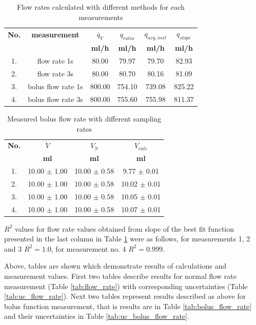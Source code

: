 \documentclass[12pt,a4paper]{article}
\begin{document}
	\begin{table}[H]
		\centering
		\begin{tabular}{|c|c|c|c|c|c|}
			\hline
			\textbf{No.} & \textbf{measurement} & $\dot{q_{V}}$ & $q_{ratio}$ & $q_{avg,inst}$ & $q_{slope}$\\
			\cline{3-6}
			& & \textbf{ml/h}& \textbf{ml/h} & \textbf{ml/h} & \textbf{ml/h}\\ \hline
			1. & flow rate 1s & 80.00 & 79.97 & 79.70 & 82.93\\ \hline
			2. & flow rate 3s & 80.00 & 80.70 & 80.16 & 81.09 \\ \hline
			3. & bolus flow rate 1s & 800.00 & 754.10 & 739.08 & 825.22 \\ \hline
			4. & bolus flow rate 3s & 800.00 & 755.60 & 755.98 & 811.37 \\ \hline
		\end{tabular}
		\caption{Flow rates calculated with different methods for each measurements}
		\label{tab:qV}
	\end{table}
	
	\begin{table}[H]
		\centering
		\begin{tabular}{|c|c|c|c|}
			\hline
			\textbf{No.} & $\dot{V}$ & $V_{S}$ & $V_{calc}$ \\
			\cline{2-4}
			& \textbf{ml} & \textbf{ml} & \textbf{ml}\\ \hline
			1. & 10.00 $\pm$ 1.00 & 10.00 $\pm$ 0.58 & 9.77 $\pm$ 0.01 \\ \hline
			2. & 10.00 $\pm$ 1.00 & 10.00 $\pm$ 0.58 & 10.02 $\pm$ 0.01  \\ \hline
			3. & 10.00 $\pm$ 1.00 & 10.00 $\pm$ 0.58 & 10.05 $\pm$ 0.01 \\ \hline
			4. & 10.00 $\pm$ 1.00 & 10.00 $\pm$ 0.58 & 10.07 $\pm$ 0.01  \\ \hline
		\end{tabular}
		\caption{Measured bolus flow rate with different sampling rates}
		\label{tab:flow_rate_volume}
	\end{table}
	
	$R^2$ values for flow rate values obtained from slope of the best fit function presented in the last column in Table \ref{tab:qV} were as follows, for measurements 1, 2 and 3 $R^2 = 1.0$, for measurement no. 4 $R^2=0.999$.
	
	Above, tables are shown which demonstrate results of calculations and measurement values. First two tables describe results for normal flow rate measurement (Table \ref{tab:flow_rate}) with corresponding uncertainties (Table \ref{tab:uc_flow_rate}). Next two tables represent results described as above for bolus function measurement, that is results are in Table \ref{tab:bolus_flow_rate} and their uncertainties in Table \ref{tab:uc_bolus_flow_rate}.
	
\end{document}

